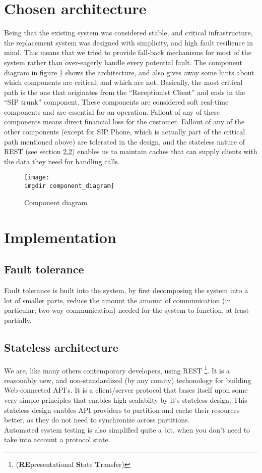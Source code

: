 \section{Chosen architecture}
Being that the existing system was considered stable, and critical infrastructure, the replacement system was designed with simplicity, and high fault resilience in mind. This means that we tried to provide fall-back mechanisms for most of the system rather than over-eagerly handle every potential fault. The component diagram in figure \ref{fig:component_diagram} shows the architecture, and also gives away some hints about which components are critical, and which are not. Basically, the most critical path is the one that originates from the ``Receptionist Client'' and ends in the ``SIP trunk'' component. These components are considered soft real-time components and are essential for an operation. Fallout of any of these components means direct financial loss for the customer. Fallout of any of the other components (except for SIP Phone, which is actually part of the critical path mentioned above) are tolerated in the design, and the stateless nature of REST (see section \ref{sec:rest}) enables us to maintain caches that can supply clients with the data they need for handling calls.

\begin{figure}[ht]
\centering
\texttt{[image: \\imgdir component\_diagram]}
\caption{Component diagram}
\label{fig:component_diagram}
\end{figure}

\section{Implementation}
\subsection{Fault tolerance}
Fault tolerance is built into the system, by first decomposing the system into a lot of smaller parts, reduce the amount the amount of communication (in particular; two-way communication) needed for the system to function, at least partially.

\subsection{Stateless architecture}
\label{sec:rest}
We are, like many others contemporary developers, using REST \footnote{(\textbf{RE}presentational \textbf{S}tate \textbf{T}ransfer)}. It is a reasonably new, and non-standardized (by any comity) techonology for building Web-connected API's. It is a client/server protocol that bases itself upon some very simple principles that enables high scalabilty by it's stateless design, This stateless design enables API providers to partition and cache their resources better, as they do not need to synchronize across partitions.\\
Automated system testing is also simplified quite a bit, when you don't need to take into account a protocol state.

